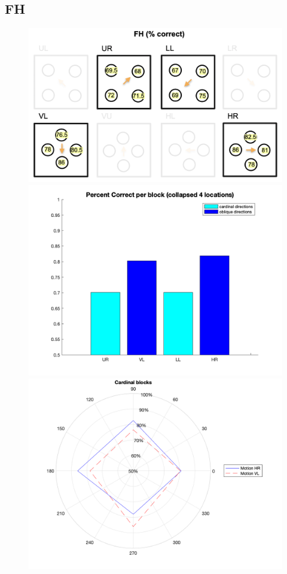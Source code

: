 \documentclass[11pt]{article} %
\begin{document}
\subsection{FH}
\begin{figure}[H]
\centering %
\includegraphics[scale=.25]{Images/FH_trialdescription.png}
\includegraphics[scale=.15]{Images/block_performance_FH.png}
\\
\includegraphics[scale=.15]{Images/FH_cardinal_plot.png}

\end{figure}
\end{document}
